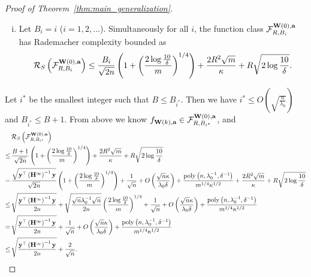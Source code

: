 \begin{proof}[Proof of Theorem~\ref{thm:main_generalization}]
\begin{enumerate}[(i)]
	 	\item 
	 	Let $B_i =  i$ ($i=1, 2, \ldots$).
	 	Simultaneously for all $i$, the function class $\mathcal{F}_{R, B_i}^{\mathbf{W}(0), \mathbf{a}}$ has Rademacher complexity bounded as
	 	\begin{align*}
	 	\mathcal{R}_S\left( \mathcal{F}^{\mathbf{W}(0),\mathbf{a}}_{R,B_i} \right)
	 	\le 	\frac{B_i}{\sqrt{2n}} \left(1+\left( \frac{2\log \frac{10}{\delta}}{m} \right)^{1/4} \right) + \frac{2 R^2 \sqrt m}{ \kappa} + R \sqrt{2\log \frac{10}{\delta}} .
	 	\end{align*}
	 \end{enumerate}
 
 
 
 Let $i^*$ be the smallest integer such that $B\le B_{i^*}$. Then we have $i^* \le O\left( \sqrt{\frac{n}{\lambda_0}} \right)$ and $B_{i^*} \le B + 1$.
 From above we know $f_{\mathbf{W}(k), \mathbf{a}}\in \mathcal{F}_{R, B_{i^*}}^{\mathbf{W}(0), \mathbf{a}}$, and
 \begin{align*}
 &\mathcal{R}_S\left( \mathcal{F}^{\mathbf{W}(0),\mathbf{a}}_{R,B_{i^*}} \right) \\
 \le \,&	\frac{B+1}{\sqrt{2n}} \left(1+\left( \frac{2\log \frac{10}{\delta}}{m} \right)^{1/4} \right) + \frac{2 R^2 \sqrt m}{ \kappa} + R \sqrt{2\log \frac{10}{\delta}} \\
 = \,& \frac{\sqrt{\mathbf{y}^\top \left(\mathbf{H}^{\infty}\right)^{-1}\mathbf{y}} }{\sqrt{2n}} \left(1+\left( \frac{2\log \frac{10}{\delta}}{m} \right)^{1/4} \right) + \frac{1}{\sqrt{n}} + O\left( \frac{ \sqrt n \kappa}{\lambda_0 \delta} \right) + \frac{\mathrm{poly}\left(n, \lambda_0^{-1}, \delta^{-1} \right)}{m^{1/4} \kappa^{1/2}} + \frac{2 R^2 \sqrt m}{ \kappa} + R \sqrt{2\log \frac{10}{\delta}} \\
 \le \,& \sqrt{\frac{\mathbf{y}^\top \left(\mathbf{H}^{\infty}\right)^{-1}\mathbf{y}}{2n}}  +  \sqrt{\frac{\sqrt n \lambda_0^{-1}\sqrt n}{2n}} \left( \frac{2\log \frac{10}{\delta}}{m} \right)^{1/4} + \frac{1}{\sqrt{n}}  + O\left( \frac{ \sqrt n \kappa}{\lambda_0 \delta} \right) + \frac{\mathrm{poly}\left(n, \lambda_0^{-1}, \delta^{-1} \right)}{m^{1/4} \kappa^{1/2}} \\
 = \,& \sqrt{\frac{\mathbf{y}^\top \left(\mathbf{H}^{\infty}\right)^{-1}\mathbf{y}}{2n}}  + \frac{1}{\sqrt{n}}  + O\left( \frac{ \sqrt n \kappa}{\lambda_0 \delta} \right) + \frac{\mathrm{poly}\left(n, \lambda_0^{-1}, \delta^{-1} \right)}{m^{1/4} \kappa^{1/2}} \\
 \le \,& \sqrt{\frac{\mathbf{y}^\top \left(\mathbf{H}^{\infty}\right)^{-1}\mathbf{y}}{2n}}   + \frac{2}{\sqrt{n}} .
 \end{align*}
 

\end{proof}
